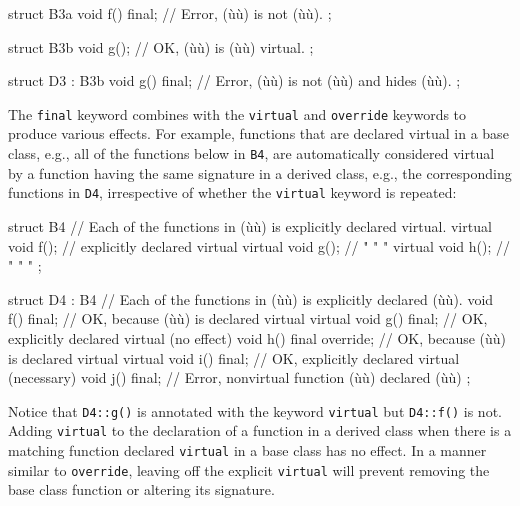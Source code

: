 {{\begin{emcppslisting}[emcppsbatch=e1]
struct B3a
{
    void f() final;  // Error, (ù{}ù) is not (ù{}ù).
};

struct B3b
{
    void g(); // OK, (ù{}ù) is (ù{}ù) virtual.
};

struct D3 : B3b
{
    void g() final; // Error, (ù{}ù) is not (ù{}ù) and hides (ù{}ù).
};
\end{emcppslisting}
    

\noindent The \lstinline!final! keyword combines with the \lstinline!virtual! and
\lstinline!override! keywords to produce various effects. For example,
functions that are declared virtual in a base class, e.g., all of the
functions below in \lstinline!B4!, are automatically considered virtual by
a function having the same signature in a derived class, e.g., the
corresponding functions in \lstinline!D4!, irrespective of whether the
\lstinline!virtual! keyword is repeated:

\begin{emcppslisting}[emcppsbatch=e1]
struct B4  // Each of the functions in (ù{}ù) is explicitly declared virtual.
{
    virtual void f();  // explicitly declared virtual
    virtual void g();  //      "        "       "
    virtual void h();  //      "        "       "
};

struct D4 : B4  // Each of the functions in (ù{}ù) is explicitly declared (ù{}ù).
{
    void f() final;          // OK, because (ù{}ù) is declared virtual
    virtual void g() final;  // OK, explicitly declared virtual (no effect)
    void h() final override; // OK, because (ù{}ù) is declared virtual
    virtual void i() final;  // OK, explicitly declared virtual (necessary)
    void j() final;          // Error, nonvirtual function (ù{}ù) declared (ù{}ù)
};
\end{emcppslisting}
    

\noindent Notice that \lstinline!D4::g()! is annotated with the keyword
\lstinline!virtual! but \lstinline!D4::f()! is not. Adding \lstinline!virtual! to
the declaration of a function in a derived class when there is a
matching function declared \lstinline!virtual! in a base class has no
effect. In a manner similar to \lstinline!override!, leaving off the
explicit \lstinline!virtual! will prevent removing the base class function
or altering its signature.

}}
